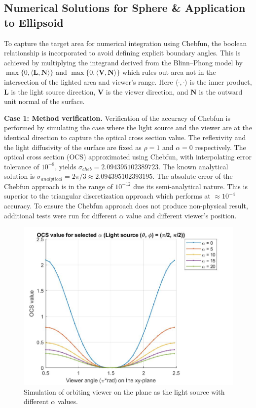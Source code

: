 \documentclass[11pt]{amsart}
\theoremstyle{definition}
\begin{document}
\subsection{Numerical Solutions for Sphere \& Application to Ellipsoid}

To capture the target area for numerical integration using Chebfun, the boolean relationship is incorporated to avoid defining explicit boundary angles. This is achieved by multiplying the integrand derived from the Blinn--Phong model by $\max\{0, \langle \mathbf{L},\mathbf{N}\rangle\}$ and $\max\{0,\langle \mathbf{V},\mathbf{N}\rangle\}$ which rules out area not in the intersection of the lighted area and viewer's range. Here $\langle\cdot, \cdot\rangle$ is the inner product, $\mathbf{L}$ is the light source direction, $\mathbf{V}$ is the viewer direction, and $\mathbf{N}$ is the outward unit normal of the surface.

{\bf Case 1: Method verification.} Verification of the accuracy of Chebfun is performed by simulating the case where the light source and the viewer are at the identical direction to capture the optical cross section value. The reflexivity and the light diffusivity of the surface are fixed as $\rho = 1$ and $\alpha =0$ respectively. The optical cross section (OCS) approximated using Chebfun, with interpolating error tolerance of $10^{-8}$, yields $\sigma_{cheb} = 2.094395102389723$. The known analytical solution is $\sigma_{analytical} = 2\pi/3 \approx 2.094395102393195$. The absolute error of the Chebfun approach is in the range of $10^{-12}$ due its semi-analytical nature. This is superior to the triangular discretization approach which performs at $\approx 10^{-4}$ accuracy. To ensure the Chebfun approach does not produce non-physical result, additional tests were run for different $\alpha$ value and different viewer's position.

\begin{figure}[h]
\centering \includegraphics[scale=0.4]{./figs/OCS_parallel_plane}    
\caption{Simulation of orbiting viewer on the plane as the light source with different $\alpha$ values.}    
\label{OCSParallelPlane}
\end{figure}
\end{document}
